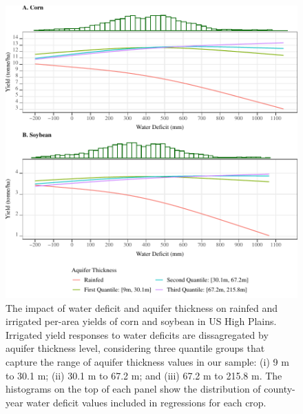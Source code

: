 \documentclass[
]{article}
\begin{document}
\begin{figure}[H]

{\centering \includegraphics[width=6.5in,]{Figures/g_yield_intensive} 

}

\caption{The impact of water deficit and aquifer thickness on rainfed and irrigated per-area yields of corn and soybean in US High Plains. Irrigated yield responses to water deficits are dissagregated by aquifer thickness level, considering three quantile groups that capture the range of aquifer thickness values in our sample: (i) 9 m to 30.1 m; (ii) 30.1 m to 67.2 m; and (iii) 67.2 m to 215.8 m. The histograms on the top of each panel show the distribution of county-year water deficit values included in regressions for each crop.}\label{fig:yield-response}
\end{figure}
\end{document}
